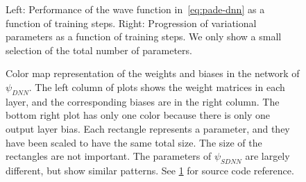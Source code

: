 \documentclass[Thesis.tex]{subfiles}
\begin{document}
\begin{figure}[h]
   \centering
    \resizebox{\linewidth}{!}{%
        
    }
    \caption[Learning progression of a neural network on quantum dots]{\label{fig:QD-pade-dnn-training}Left: Performance of the wave
function in~\cref{eq:pade-dnn} as a function of training steps. Right:
Progression of variational parameters as a function of training steps. We only
show a small selection of the total number of parameters.}
\end{figure}

\begin{table}[h]
  \centering
  \label{tab:pade-dnn-energy-results}
  \caption[Energy estimates using a neural network on quantum dots]{Energy using the neural network wave function in~\cref{eq:pade-dnn}, along with
the benchmark wave function after the same amount of optimization. Results obtained
from $2^{22}$ samples and errors estimated by an automated blocking
algorithm by~\textcite{Jonsson-2018}. Energies in atomic units $[\si{\au}]$. See
\cref{fig:QD-pade-dnn-training} for source code reference.}
  
\end{table}

%         

\begin{figure}[h]
   \centering
    \resizebox{\linewidth}{!}{%
        
    }
    \caption[Weights of a neural network trained on quantum
dots]{\label{fig:QD-pade-dnn-weights}Color map representation of the weights and
biases in the network of $\psi_{DNN}$. The left column of plots shows the weight
matrices in each layer, and the corresponding biases are in the right column.
The bottom right plot has only one color because there is only one output layer
bias. Each rectangle represents a parameter, and they have been scaled to have
the same total size. The size of the rectangles are not important. The
parameters of $\psi_{SDNN}$ are largely different, but show similar patterns.
See \cref{fig:QD-pade-dnn-training} for source code reference.}
\end{figure}
\end{document}
